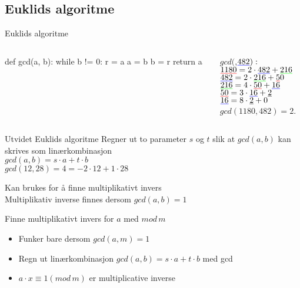 \subsection*{Euklids algoritme}
\begin{frame}[fragile]{Euklids algoritme}
\begin{columns}
    \begin{column}{0.45\textwidth}
\begin{python}
def gcd(a, b):
    while b != 0:
        r = a %
        a = b
        b = r
    return a
\end{python}
 	\end{column}
 	\pause
    \begin{column}{0.45\textwidth}
        $gcd($,$\mathunderline{blue}{482}):$\\[2mm]
        \pause
        $\mathunderline{red}{1180} = 2 \cdot \mathunderline{blue}{482} + \mathunderline{green}{216}$\\
        \pause
        $\mathunderline{blue}{482} = 2 \cdot \mathunderline{green}{216} + \mathunderline{red}50$\\
        \pause
        $\mathunderline{green}{216} = 4 \cdot \mathunderline{red}{50} + \mathunderline{blue}{16}$\\
        \pause
        $\mathunderline{red}{50} = 3 \cdot \mathunderline{blue}{16} + \underline{2}$\\
        \pause
        $\mathunderline{blue}{16} = 8 \cdot \underline{2} + 0$\\[2mm]

        \pause
        $gcd(1180,482) = 2$.
 	\end{column}
\end{columns}


\end{frame}

\begin{frame}[fragile]{}
\begin{block}{Utvidet Euklids algoritme}
Regner ut to parameter $s$ og $t$ slik at $gcd(a,b)$ kan skrives som linærkombinasjon\\
$gcd(a,b)=s\cdot a+t\cdot b$\\
$gcd(12,28)=4=-2\cdot 12 + 1\cdot 28$\medskip

Kan brukes for å finne multiplikativt invers\\
Multiplikativ inverse finnes dersom $gcd(a,b)=1$
\end{block}
\pause

\begin{block}{Finne multiplikativt invers for $a$ med $mod\, m$}
\begin{itemize}
\item Funker bare dersom $gcd(a,m)=1$\\
\item Regn ut linærkombinasjon $gcd(a,b)=s\cdot a+t\cdot b$ med gcd
\item $a\cdot x \equiv 1 (mod\, m)$ er multiplicative inverse
\end{itemize}
\end{block}
\end{frame}

